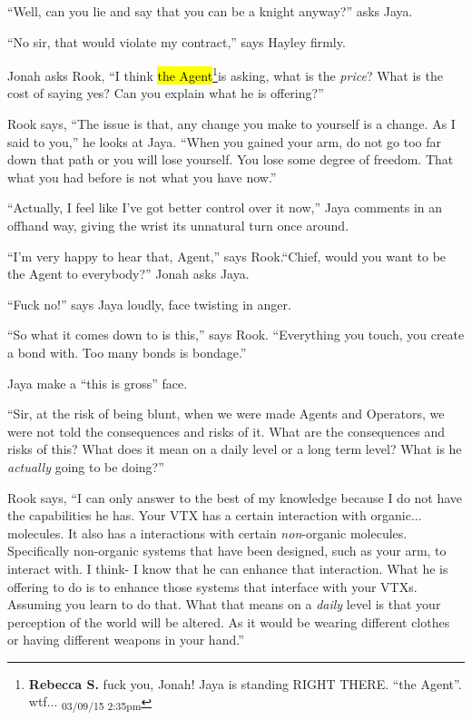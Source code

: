 ``Well, can you lie and say that you can be a knight anyway?'' asks Jaya.

``No sir, that would violate my contract,'' says Hayley firmly.



Jonah asks Rook, ``I think \hl{the Agent}\footnote{\textbf{Rebecca S. }fuck you, Jonah! Jaya is standing RIGHT THERE.  ``the Agent''. wtf... \textsubscript{03/09/15 2:35pm}}is asking, what is the \textit{price}?  What is the cost of saying yes?  Can you explain what he is offering?''

Rook says, ``The issue is that, any change you make to yourself is a change.  As I said to you,'' he looks at Jaya. ``When you gained your arm, do not go too far down that path or you will lose yourself.  You lose some degree of freedom.  That what you had before is not what you have now.''

``Actually, I feel like I've got better control over it now,'' Jaya comments in an offhand way, giving the wrist its unnatural turn once around.

``I'm very happy to hear that, Agent,'' says Rook.``Chief, would you want to be the Agent to everybody?'' Jonah asks Jaya.

``Fuck no!'' says Jaya loudly, face twisting in anger.

``So what it comes down to is this,'' says Rook.  ``Everything you touch, you create a bond with.  Too many bonds is bondage.''

Jaya make a ``this is gross'' face.

``Sir, at the risk of being blunt, when we were made Agents and Operators, we were not told the consequences and risks of it.  What are the consequences and risks of this?  What does it mean on a daily level or a long term level?  What is he \textit{actually} going to be doing?''

Rook says, ``I can only answer to the best of my knowledge because I do not have the capabilities he has.  Your VTX has a certain interaction with organic... molecules.  It also has a interactions with certain \textit{non}-organic molecules.  Specifically non-organic systems that have been designed, such as your arm, to interact with.  I think- I know that he can enhance that interaction.  What he is offering to do is to enhance those systems that interface with your VTXs.  Assuming you learn to do that.  What that means on a \textit{daily} level is that your perception of the world will be altered.  As it would be wearing different clothes or having different weapons in your hand.''

